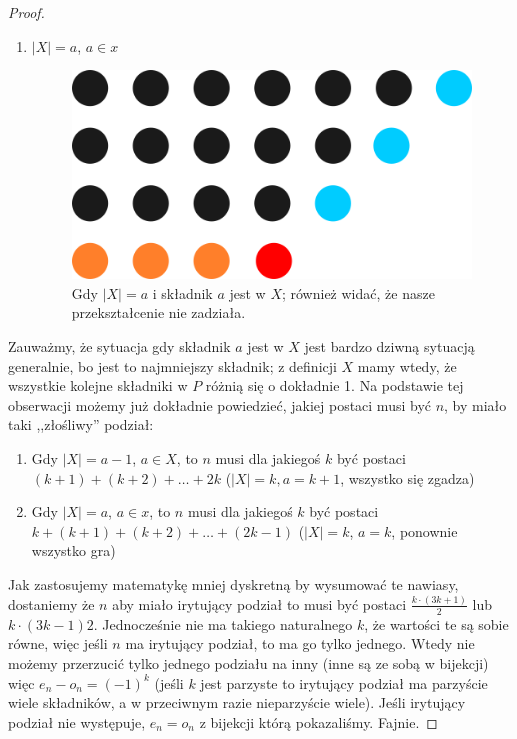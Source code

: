 \begin{proof}
\begin{enumerate}
		\item $|X| = a$, $a \in x$
		      \begin{figure}[H]
			      \centering
			      \includegraphics{images/irytujacy_2.png}
			      \caption{Gdy $|X| = a$ i składnik $a$ jest w $X$; również widać, że nasze przekształcenie nie zadziała.}
		      \end{figure}
	\end{enumerate}

	Zauważmy, że sytuacja gdy składnik $a$ jest w $X$ jest bardzo dziwną sytuacją generalnie, bo jest to najmniejszy składnik; z definicji $X$ mamy wtedy, że wszystkie kolejne składniki w $P$ różnią się o dokładnie 1. Na podstawie tej obserwacji możemy już dokładnie powiedzieć, jakiej postaci musi być $n$, by miało taki ,,złośliwy'' podział:

	\begin{enumerate}
		\item Gdy $|X| = a - 1$, $a \in X$, to $n$ musi dla jakiegoś $k$ być postaci $(k + 1) + (k + 2) + \dots + 2k $ ($|X| =k, a = k+1$, wszystko się zgadza)
		\item Gdy $|X| = a$, $a \in x$, to $n$ musi dla jakiegoś $k$ być postaci $k + (k+1) + (k+2) + \dots + (2k - 1)$ ($|X| = k$, $a = k$, ponownie wszystko gra)
	\end{enumerate}

	Jak zastosujemy matematykę mniej dyskretną by wysumować te nawiasy, dostaniemy że $n$ aby miało irytujący podział to musi być postaci $\frac{k \cdot (3k+1)}{2}$ lub ${k \cdot (3k-1)}{2}$. Jednocześnie nie ma takiego naturalnego $k$, że wartości te są sobie równe, więc jeśli $n$ ma irytujący podział, to ma go tylko jednego. Wtedy nie możemy przerzucić tylko jednego podziału na inny (inne są ze sobą w bijekcji) więc $e_n - o_n = (-1)^k$ (jeśli $k$ jest parzyste to irytujący podział ma parzyście wiele składników, a w przeciwnym razie nieparzyście wiele). Jeśli irytujący podział nie występuje, $e_n = o_n$ z bijekcji którą pokazaliśmy. Fajnie.
\end{proof}

